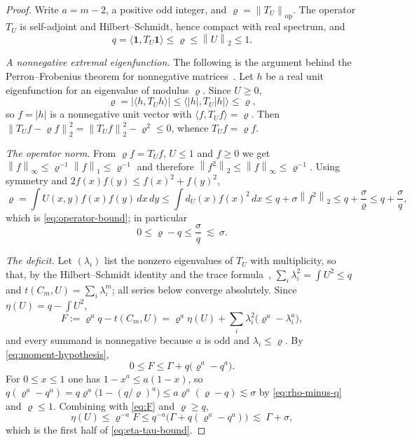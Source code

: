 \documentclass[11pt]{article}
\theoremstyle{remark}
\newcommand{\ind}{\mathbf{1}}
\newcommand{\op}{\mathrm{op}}
\newcommand{\norm}[1]{\left\lVert #1\right\rVert}
\newcommand{\abs}[1]{\left\lvert #1\right\rvert}
\begin{document}
\begin{proof}
Write $a=m-2$, a positive odd integer, and
$\varrho=\norm{T_U}_{\op}$. The operator $T_U$ is self-adjoint and
Hilbert--Schmidt, hence compact with real spectrum, and
\[
 q=\langle\ind,T_U\ind\rangle\leq\varrho\leq\norm{U}_2\leq1 .
\]

\emph{A nonnegative extremal eigenfunction.}
The following is the argument behind the Perron--Frobenius theorem for
nonnegative matrices~\cite[Chapter~8]{horn2012matrix}. Let $h$ be a real unit eigenfunction for an eigenvalue of modulus
$\varrho$. Since $U\geq0$,
\[
 \varrho=\abs{\langle h,T_Uh\rangle}\leq\langle\abs h,T_U\abs h\rangle
 \leq\varrho,
\]
so $f=\abs h$ is a nonnegative unit vector with
$\langle f,T_Uf\rangle=\varrho$. Then
$\norm{T_Uf-\varrho f}_2^2=\norm{T_Uf}_2^2-\varrho^2\leq0$, whence
$T_Uf=\varrho f$.

\emph{The operator norm.}
From $\varrho f=T_Uf$, $U\leq1$ and $f\geq0$ we get
$\norm f_\infty\leq\varrho^{-1}\norm f_1\leq\varrho^{-1}$ and therefore
$\norm{f^2}_2\leq\norm f_\infty\leq\varrho^{-1}$. Using symmetry and
$2f(x)f(y)\leq f(x)^2+f(y)^2$,
\[
 \varrho=\int U(x,y)f(x)f(y)\,dx\,dy
 \leq\int d_U(x)f(x)^2\,dx
 \leq q+\sigma\norm{f^2}_2\leq q+\frac{\sigma}{\varrho}
 \leq q+\frac{\sigma}{q},
\]
which is \eqref{eq:operator-bound}; in particular
\begin{equation}\label{eq:rho-minus-q}
 0\leq\varrho-q\leq\frac{\sigma}{q}\ \lesssim\ \sigma .
\end{equation}

\emph{The deficit.}
Let $(\lambda_i)$ list the nonzero eigenvalues of $T_U$ with
multiplicity, so that, by the Hilbert--Schmidt identity and the trace
formula~\cite{lovasz2012large}, $\sum_i\lambda_i^2=\int U^2\leq q$ and
$t(C_m,U)=\sum_i\lambda_i^m$; all series below converge absolutely.
Since $\eta(U)=q-\int U^2$,
\begin{equation}\label{eq:F}
 F:=\varrho^aq-t(C_m,U)
 =\varrho^a\eta(U)+\sum_i\lambda_i^2\bigl(\varrho^a-\lambda_i^a\bigr),
\end{equation}
and every summand is nonnegative because $a$ is odd and
$\lambda_i\leq\varrho$. By \eqref{eq:moment-hypothesis},
\begin{equation}\label{eq:F-upper}
 0\leq F\leq\Gamma+q\bigl(\varrho^a-q^a\bigr).
\end{equation}
For $0\leq x\leq1$ one has $1-x^a\leq a(1-x)$, so
$q(\varrho^a-q^a)=q\varrho^a\bigl(1-(q/\varrho)^a\bigr)
\leq a\varrho^{a}(\varrho-q)\lesssim\sigma$ by \eqref{eq:rho-minus-q}
and $\varrho\leq1$. Combining with \eqref{eq:F} and $\varrho\geq q$,
\[
 \eta(U)\leq\varrho^{-a}F\leq q^{-a}\bigl(\Gamma+q(\varrho^a-q^a)\bigr)
 \ \lesssim\ \Gamma+\sigma ,
\]
which is the first half of \eqref{eq:eta-tau-bound}.


\end{proof}
\end{document}
